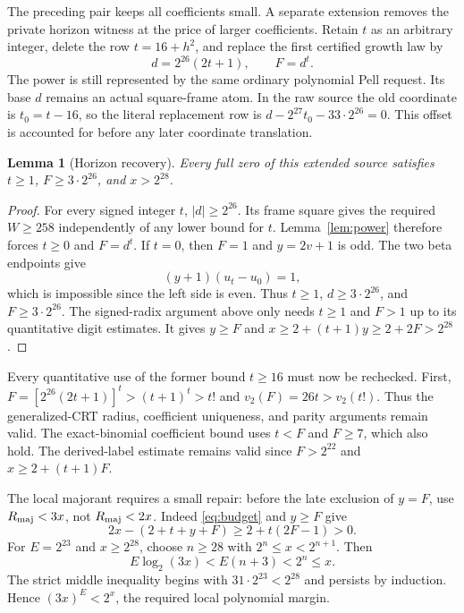 \documentclass[11pt]{article}
\newtheorem{lemma}[theorem]{Lemma}
\theoremstyle{remark}\newtheorem{remark}[theorem]{Remark}
\begin{document}
The preceding pair keeps all coefficients small. A separate extension
removes the private horizon witness at the price of larger coefficients.
Retain $t$ as an arbitrary integer, delete the row $t=16+h^2$, and replace
the first certified growth law by
\begin{equation}\label{eq:horizonbase}
 d=2^{26}(2t+1),\qquad F=d^t.
\end{equation}
The power is still represented by the same ordinary polynomial Pell
request. Its base $d$ remains an actual square-frame atom. In the raw
source the old coordinate is $t_0=t-16$, so the literal replacement row is
$d-2^{27}t_0-33\cdot2^{26}=0$. This offset is accounted for before
any later coordinate translation.

\begin{lemma}[Horizon recovery]\label{lem:horizon}
Every full zero of this extended source satisfies $t\ge1$,
$F\ge3\cdot2^{26}$, and $x>2^{28}$.
\end{lemma}
\begin{proof}
For every signed integer $t$, $|d|\ge2^{26}$. Its frame square gives
the required $W\ge258$ independently of any lower bound for $t$.
Lemma~\ref{lem:power} therefore forces $t\ge0$ and $F=d^t$.
If $t=0$, then $F=1$ and $y=2v+1$ is odd. The two beta endpoints
give
\[
 (y+1)(u_t-u_0)=1,
\]
which is impossible since the left side is even. Thus $t\ge1$,
$d\ge3\cdot2^{26}$, and $F\ge3\cdot2^{26}$.
The signed-radix argument above only needs $t\ge1$ and $F>1$ up
to its quantitative digit estimates. It gives $y\ge F$ and
$x\ge2+(t+1)y\ge2+2F>2^{28}$.
\end{proof}

Every quantitative use of the former bound $t\ge16$ must now be
rechecked. First, $F=[2^{26}(2t+1)]^t>(t+1)^t>t!$ and
$v_2(F)=26t>v_2(t!)$. Thus the generalized-CRT radius, coefficient
uniqueness, and parity arguments remain valid. The exact-binomial
coefficient bound uses $t<F$ and $F\ge7$, which also hold.
The derived-label estimate remains valid since $F>2^{22}$ and
$x\ge2+(t+1)F$.

The local majorant requires a small repair: before the late exclusion
of $y=F$, use $R_{\rm maj}<3x$, not $R_{\rm maj}<2x$.
Indeed \eqref{eq:budget} and $y\ge F$ give
\[
 2x-(2+t+y+F)\ge2+t(2F-1)>0.
\]
For $E=2^{23}$ and $x\ge2^{28}$, choose $n\ge28$ with
$2^n\le x<2^{n+1}$. Then
\[
 E\log_2(3x)<E(n+3)<2^n\le x.
\]
The strict middle inequality begins with $31\cdot2^{23}<2^{28}$
and persists by induction. Hence $(3x)^E<2^x$, the required local
polynomial margin.
\end{document}
